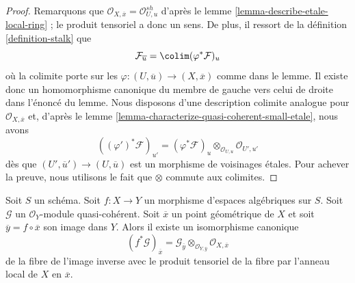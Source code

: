 \begin{proof}
Remarquons que $\mathcal{O}_{X, \overline{x}} = \mathcal{O}_{U, u}^{sh}$ d'après le
lemme \ref{lemma-describe-etale-local-ring} ;
le produit tensoriel a donc un sens. De plus, il ressort de la
définition \ref{definition-stalk}
que
$$
\mathcal{F}_{\overline{u}} = \colim (\varphi^*\mathcal{F})_u
$$
où la colimite porte sur les $\varphi : (U, \overline{u}) \to (X, \overline{x})$
comme dans le lemme. Il existe donc un homomorphisme canonique du membre de gauche vers celui de droite dans
l'énoncé du lemme. Nous disposons d'une description colimite analogue pour
$\mathcal{O}_{X, \overline{x}}$
et, d'après le
lemme \ref{lemma-characterize-quasi-coherent-small-etale},
nous avons
$$
((\varphi')^*\mathcal{F})_{u'} =
(\varphi^*\mathcal{F})_u \otimes_{\mathcal{O}_{U, u}} \mathcal{O}_{U', u'}
$$
dès que $(U', \overline{u}') \to (U, \overline{u})$ est un morphisme de
voisinages \'etales. Pour achever la preuve, nous utilisons le fait que
$\otimes$ commute aux colimites.
\end{proof}

\begin{lemma}
\label{lemma-stalk-pullback-quasi-coherent}
Soit $S$ un schéma. Soit $f : X \to Y$ un morphisme d'espaces algébriques
sur $S$. Soit $\mathcal{G}$ un $\mathcal{O}_Y$-module quasi-cohérent.
Soit $\overline{x}$ un point géométrique de $X$ et soit
$\overline{y} = f \circ \overline{x}$ son image dans $Y$.
Alors il existe un isomorphisme canonique
$$
(f^*\mathcal{G})_{\overline{x}} =
\mathcal{G}_{\overline{y}} \otimes_{\mathcal{O}_{Y, \overline{y}}}
\mathcal{O}_{X, \overline{x}}
$$
de la fibre de l'image inverse avec le produit tensoriel de la fibre
par l'anneau local de $X$ en $\overline{x}$.
\end{lemma}

